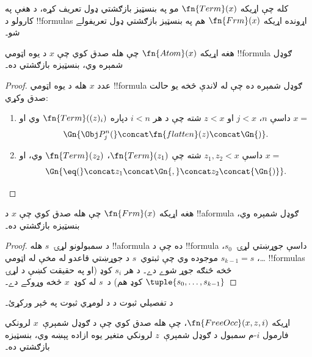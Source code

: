 \documentclass[../../../include/open-logic-section]{subfiles}
\begin{document}

کله چې اړيکه $\fn{Term}(x)$ مو په بنسټيز بازګشتي ډول تعريف کړه، د
هغې په کارولو د !!{formula}s اړونده اړيکه $\fn{Frm}(x)$ هم په
بنسټيز بازګشتي ډول تعريفولے شو۔

\begin{prop}
هغه اړيکه $\fn{Atom}(x)$ چې هله صدق کوي چې $x$ د يوه اټومي
!!{formula} ګوډل شمېره وي، بنسټيزه بازګشتي ده۔
\end{prop}

\begin{proof}
عدد $x$ هله د يوه اټومي !!{formula} ګوډل شمېره ده چې له لاندې څخه
يو حالت صدق وکړي:
\begin{enumerate}
\item داسې $n$، $j<x$ او $z<x$ شته چې د هر $i<n$ دپاره
  $\fn{Term}((z)_i)$ وي او $x = $
\[
\Gn{\Obj P^n_j(} \concat \fn{flatten}(z) \concat \Gn{)}.
\]
\item داسې $z_1,z_2<x$ شته چې $\fn{Term}(z_1)$،
  $\fn{Term}(z_2)$ وي، او $x = $
\[
\Gn{{\eq}(} \concat z_1 \concat \Gn{,} \concat z_2 \concat{\Gn{)}}.
\]
\end{enumerate}
\end{proof}

\begin{prop}
هغه اړيکه $\fn{Frm}(x)$ چې هله صدق کوي چې $x$ د !!a{formula} ګوډل
شمېره وي، بنسټيزه بازګشتي ده۔
\end{prop}

\begin{proof}
د سمبولونو لړۍ~$s$ هله !!a{formula} ده چې د !!{formula} داسې
جوړښتي لړۍ~$s_0$، \dots، $s_{k-1}=s$ موجوده وي چې ثبتوي~$s$ د
جوړښتي قاعدو له مخې له اټومي !!{formula}s څخه څنګه جوړ شوے دے۔ د هر
$s_i$ کوډ (او په حقيقت کښې د لړۍ $\tuple{s_0, \dots, s_{k-1}}$ کوډ
هم) د~$s$ له کوډ~$x$ څخه وړوکے دے۔
\end{proof}

\begin{prob}
د  تفصيلي ثبوت د
 د لومړي ثبوت په څېر ورکړئ۔
\end{prob}

\begin{prop}
اړيکه $\fn{FreeOcc}(x,z,i)$، چې هله صدق کوي چې د ګوډل شمېرې~$x$
لرونکي فارمول $i$-م سمبول د ګوډل شمېرې~$z$ لرونکي متغير يوه ازاده
پېښه وي، بنسټيزه بازګشتي ده۔
\end{prop}
\end{document}
